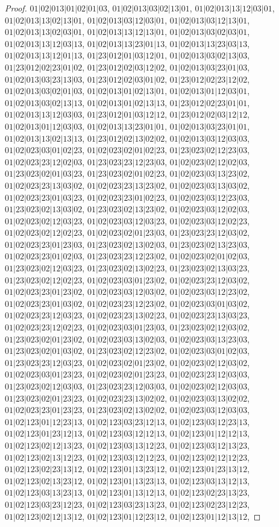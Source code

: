 \documentclass[12pt]{article}
\theoremstyle{plain}
\theoremstyle{definition}
\theoremstyle{remark}
\begin{document}
\begin{proof}
$01|02|013|01|02|01|03$, $01|02|013|03|02|13|01$, $01|02|013|13|12|03|01$, $01|02|013|13|02|13|01$, $01|02|013|03|12|03|01$, $01|02|013|03|12|13|01$, $01|02|013|13|02|03|01$, $01|02|013|13|12|13|01$, $01|02|013|03|02|03|01$, $01|02|013|13|12|03|13$, $01|02|013|13|23|01|13$, $01|02|013|13|23|03|13$, $01|02|013|13|12|01|13$, $01|23|012|01|03|12|01$, $01|02|013|03|02|13|03$, $01|23|012|02|23|01|02$, $01|23|012|02|03|12|02$, $01|02|013|03|23|01|03$, $01|02|013|03|23|13|03$, $01|23|012|02|03|01|02$, $01|23|012|02|23|12|02$, $01|02|013|03|02|01|03$, $01|02|013|01|02|13|01$, $01|02|013|01|12|03|01$, $01|02|013|03|02|13|13$, $01|02|013|01|02|13|13$, $01|23|012|02|23|01|01$, $01|02|013|13|12|03|03$, $01|23|012|01|03|12|12$, $01|23|012|02|03|12|12$, $01|02|013|01|12|03|03$, $01|02|013|13|23|01|01$, $01|02|013|03|23|01|01$, $01|02|013|13|02|13|13$, $01|23|012|02|13|02|02$, $01|02|013|03|12|03|03$, $01|02|023|03|01|02|23$, $01|02|023|02|01|02|23$, $01|23|023|02|12|23|03$, $01|02|023|23|12|02|03$, $01|23|023|23|12|23|03$, $01|02|023|02|12|02|03$, $01|23|023|02|01|03|23$, $01|23|023|02|01|02|23$, $01|02|023|03|13|23|02$, $01|02|023|23|13|03|02$, $01|02|023|23|13|23|02$, $01|02|023|03|13|03|02$, $01|02|023|23|01|03|23$, $01|02|023|23|01|02|23$, $01|02|023|03|12|23|03$, $01|23|023|02|13|03|02$, $01|23|023|02|13|23|02$, $01|02|023|03|12|02|03$, $01|02|023|02|12|03|23$, $01|02|023|03|12|03|23$, $01|02|023|03|12|02|23$, $01|02|023|02|12|02|23$, $01|02|023|02|01|23|03$, $01|23|023|23|12|03|02$, $01|02|023|23|01|23|03$, $01|23|023|02|13|02|03$, $01|23|023|02|13|23|03$, $01|02|023|23|01|02|03$, $01|23|023|23|12|23|02$, $01|02|023|02|01|02|03$, $01|23|023|02|12|03|23$, $01|23|023|02|13|02|23$, $01|23|023|02|13|03|23$, $01|23|023|02|12|02|23$, $01|02|023|03|01|23|02$, $01|02|023|23|12|03|02$, $01|02|023|23|01|23|02$, $01|02|023|03|12|03|02$, $01|02|023|03|12|23|02$, $01|02|023|23|01|03|02$, $01|02|023|23|12|23|02$, $01|02|023|03|01|03|02$, $01|02|023|23|12|03|23$, $01|02|023|23|13|02|23$, $01|02|023|23|13|03|23$, $01|02|023|23|12|02|23$, $01|02|023|03|01|23|03$, $01|23|023|02|12|03|02$, $01|23|023|02|01|23|02$, $01|02|023|03|13|02|03$, $01|02|023|03|13|23|03$, $01|23|023|02|01|03|02$, $01|23|023|02|12|23|02$, $01|02|023|03|01|02|03$, $01|23|023|23|12|03|23$, $01|02|023|02|01|23|02$, $01|02|023|02|12|03|02$, $01|02|023|03|01|23|23$, $01|02|023|02|01|23|23$, $01|02|023|23|12|03|03$, $01|23|023|02|12|03|03$, $01|23|023|23|12|03|03$, $01|02|023|02|12|03|03$, $01|23|023|02|01|23|23$, $01|02|023|23|13|02|02$, $01|02|023|03|13|02|02$, $01|02|023|23|01|23|23$, $01|23|023|02|13|02|02$, $01|02|023|03|12|03|03$, $01|02|123|01|12|23|13$, $01|02|123|03|23|12|13$, $01|02|123|03|12|23|13$, $01|02|123|01|23|12|13$, $01|02|123|03|12|12|13$, $01|02|123|01|12|12|13$, $01|02|123|02|12|13|23$, $01|02|123|03|13|12|23$, $01|02|123|03|12|13|23$, $01|02|123|02|13|12|23$, $01|02|123|03|12|12|23$, $01|02|123|02|12|12|23$, $01|02|123|02|23|13|12$, $01|02|123|01|13|23|12$, $01|02|123|01|23|13|12$, $01|02|123|02|13|23|12$, $01|02|123|01|13|23|13$, $01|02|123|03|13|12|13$, $01|02|123|03|13|23|13$, $01|02|123|01|13|12|13$, $01|02|123|02|23|13|23$, $01|02|123|03|23|12|23$, $01|02|123|03|23|13|23$, $01|02|123|02|23|12|23$, $01|02|123|02|12|13|12$, $01|02|123|01|12|23|12$, $01|02|123|01|12|13|12$, 
\end{proof}
\end{document}
